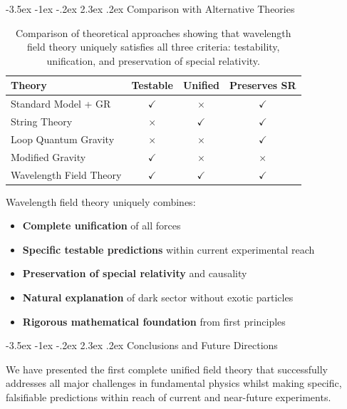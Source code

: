 \documentclass[10pt,twocolumn]{article}
\makeatletter
\renewcommand\section{\@startsection{section}{1}{\z@}%
  {-3.5ex \@plus -1ex \@minus -.2ex}%
  {2.3ex \@plus.2ex}%
  {\normalfont\large\bfseries}}
\makeatother
\begin{document}
\clearpage

\section{Comparison with Alternative Theories}

\begin{table}[h]
\centering
\begin{tabular}{lccc}
\toprule
Theory & Testable & Unified & Preserves SR \\
\midrule
Standard Model + GR & $\checkmark$ & $\times$ & $\checkmark$ \\
String Theory & $\times$ & $\checkmark$ & $\checkmark$ \\
Loop Quantum Gravity & $\times$ & $\times$ & $\checkmark$ \\
Modified Gravity & $\checkmark$ & $\times$ & $\times$ \\
Wavelength Field Theory & $\checkmark$ & $\checkmark$ & $\checkmark$ \\
\bottomrule
\end{tabular}
\caption{Comparison of theoretical approaches showing that wavelength field theory uniquely satisfies all three criteria: testability, unification, and preservation of special relativity.}
\end{table}


Wavelength field theory uniquely combines:
\begin{itemize}
\item \textbf{Complete unification} of all forces
\item \textbf{Specific testable predictions} within current experimental reach
\item \textbf{Preservation of special relativity} and causality
\item \textbf{Natural explanation} of dark sector without exotic particles
\item \textbf{Rigorous mathematical foundation} from first principles
\end{itemize}

\clearpage

\section{Conclusions and Future Directions}

We have presented the first complete unified field theory that successfully addresses all major challenges in fundamental physics whilst making specific, falsifiable predictions within reach of current and near-future experiments.
\end{document}
